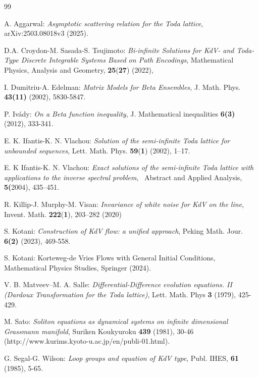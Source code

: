 \documentclass[a4paper]{article}%
\begin{document}
\begin{thebibliography}{99}                                                                                               %


A. Aggarwal: \textit{Asymptotic scattering relation for the Toda
lattice}, arXiv:2503.08018v3 (2025).

D.A. Croydon-M. Sasada-S. Tsujimoto: \textit{Bi-infinite Solutions
for KdV- and Toda-Type Discrete Integrable Systems Based on Path Encodings},
Mathematical Physics, Analysis and Geometry, \textbf{25}(\textbf{27}) (2022),

I. Dumitriu-A. Edelman: \textit{Matrix Models for Beta Ensembles,}
J. Math. Phys. \textbf{43(11)} (2002), 5830-5847.

P. Iv\'{a}dy: \textit{On a Beta function inequality}, J.
Mathematical inequalities \textbf{6(3)} (2012), 333-341.

E. K. Ifantis-K. N. Vlachou: \textit{Solution of the
semi-infinite Toda lattice for unbounded sequences}, Lett. Math. Phys.
\textbf{59}(\textbf{1}) (2002), 1--17.

E. K Ifantis-K. N. Vlachou: \textit{Exact solutions of the
semi-infinite Toda lattice with applications to the inverse spectral problem},
~Abstract and Applied Analysis, \textbf{5(}2004), 435--451. \newline

R. Killip-J. Murphy-M. Visan: \textit{Invariance of white noise
for KdV on the line}, Invent. Math. \textbf{222}(\textbf{1}), 203--282 (2020)

S. Kotani: \textit{Construction of KdV flow: a unified approach},
Peking Math. Jour. \textbf{6(2)} (2023), 469-558.

S. Kotani: Korteweg-de Vries Flows with General Initial
Conditions, Mathematical Physics Studies, Springer (2024).

V. B. Matveev--M. A. Salle: \textit{Differential-Difference
evolution equations. II (Dardoux Transformation for the Toda lattice)}, Lett.
Math. Phys \textbf{3} (1979), 425-429.

M. Sato: \textit{Soliton equations as dynamical systems on
infinite dimensional Grassmann manifold}, Suriken Koukyuroku \textbf{439}
(1981), 30-46 (http://www.kurims.kyoto-u.ac.jp/en/publi-01.html).

G. Segal-G. Wilson: \textit{Loop groups and equation of KdV
type}, Publ. IHES, \textbf{61} (1985), 5-65.


\end{thebibliography}
\end{document}
